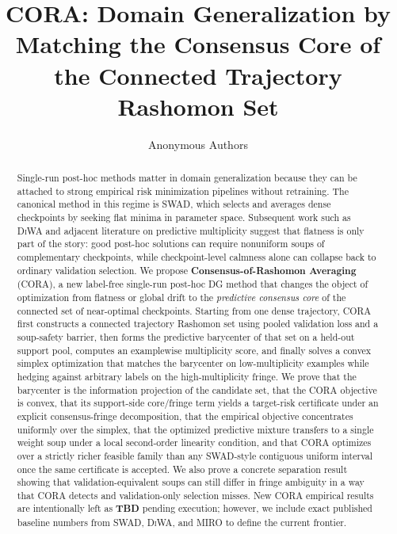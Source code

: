 \documentclass{article}
\title{CORA: Domain Generalization by Matching the Consensus Core of the Connected Trajectory Rashomon Set}
\author{Anonymous Authors}
\newcommand{\TBD}{\textbf{TBD}}
\newcommand{\cora}{\textup{\textsc{CORA}}}
\newcommand{\swad}{\textup{\textsc{SWAD}}}
\newcommand{\diwa}{\textup{\textsc{DiWA}}}
\newcommand{\miro}{\textup{\textsc{MIRO}}}
\begin{document}
\maketitle

\begin{abstract}
Single-run post-hoc methods matter in domain generalization because they can be attached to strong empirical risk minimization pipelines without retraining. The canonical method in this regime is \swad, which selects and averages dense checkpoints by seeking flat minima in parameter space. Subsequent work such as \diwa{} and adjacent literature on predictive multiplicity suggest that flatness is only part of the story: good post-hoc solutions can require nonuniform soups of complementary checkpoints, while checkpoint-level calmness alone can collapse back to ordinary validation selection. We propose \textbf{Consensus-of-Rashomon Averaging} (\cora), a new label-free single-run post-hoc DG method that changes the object of optimization from flatness or global drift to the \emph{predictive consensus core} of the connected set of near-optimal checkpoints. Starting from one dense trajectory, \cora{} first constructs a connected trajectory Rashomon set using pooled validation loss and a soup-safety barrier, then forms the predictive barycenter of that set on a held-out support pool, computes an examplewise multiplicity score, and finally solves a convex simplex optimization that matches the barycenter on low-multiplicity examples while hedging against arbitrary labels on the high-multiplicity fringe. We prove that the barycenter is the information projection of the candidate set, that the \cora{} objective is convex, that its support-side core/fringe term yields a target-risk certificate under an explicit consensus-fringe decomposition, that the empirical objective concentrates uniformly over the simplex, that the optimized predictive mixture transfers to a single weight soup under a local second-order linearity condition, and that \cora{} optimizes over a strictly richer feasible family than any \swad-style contiguous uniform interval once the same certificate is accepted. We also prove a concrete separation result showing that validation-equivalent soups can still differ in fringe ambiguity in a way that \cora{} detects and validation-only selection misses. New \cora{} empirical results are intentionally left as \TBD{} pending execution; however, we include exact published baseline numbers from \swad, \diwa, and \miro{} to define the current frontier.
\end{abstract}
\end{document}
